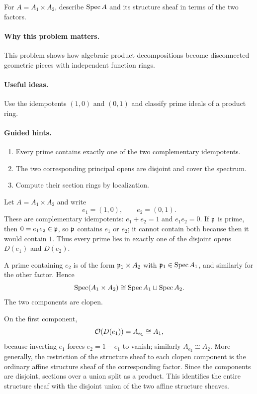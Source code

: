 \begin{problem}\label{prob:vi17-p09}
For $A=A_1\times A_2$, describe $\operatorname{Spec} A$ and its structure sheaf in terms of the two factors.
\end{problem}

\ifdefined\FullProblemDossiers
\paragraph{Why this problem matters.}
This problem shows how algebraic product decompositions become disconnected geometric pieces with independent function rings.

\paragraph{Useful ideas.}
Use the idempotents $(1,0)$ and $(0,1)$ and classify prime ideals of a product ring.

\paragraph{Guided hints.}
\begin{enumerate}
\item Every prime contains exactly one of the two complementary idempotents.
\item The two corresponding principal opens are disjoint and cover the spectrum.
\item Compute their section rings by localization.
\end{enumerate}

\begin{solution}
Let $A=A_1\times A_2$ and write
\[
e_1=(1,0),\qquad e_2=(0,1).
\]
These are complementary idempotents: $e_1+e_2=1$ and $e_1e_2=0$.  If $\mathfrak p$ is prime, then $0=e_1e_2\in\mathfrak p$, so $\mathfrak p$ contains $e_1$ or $e_2$; it cannot contain both because then it would contain $1$.  Thus every prime lies in exactly one of the disjoint opens $D(e_1)$ and $D(e_2)$.

A prime containing $e_2$ is of the form $\mathfrak p_1\times A_2$ with $\mathfrak p_1\in\operatorname{Spec} A_1$, and similarly for the other factor.  Hence
\[
\operatorname{Spec}(A_1\times A_2)\cong\operatorname{Spec} A_1\sqcup\operatorname{Spec} A_2.
\]
The two components are clopen.

On the first component,
\[
\mathcal O(D(e_1))=A_{e_1}\cong A_1,
\]
because inverting $e_1$ forces $e_2=1-e_1$ to vanish; similarly $A_{e_2}\cong A_2$.  More generally, the restriction of the structure sheaf to each clopen component is the ordinary affine structure sheaf of the corresponding factor.  Since the components are disjoint, sections over a union split as a product.  This identifies the entire structure sheaf with the disjoint union of the two affine structure sheaves.
\end{solution}



